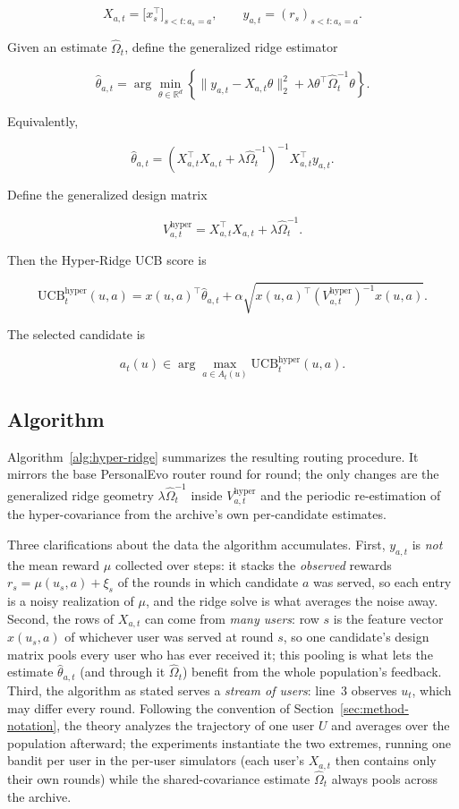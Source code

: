 \documentclass{article} %
\begin{document}
\[
X_{a,t} = \bigl[ x_s^\top \bigr]_{s < t : a_s = a}, \qquad
y_{a,t} = (r_s)_{s < t : a_s = a}.
\]

Given an estimate $\widehat{\Omega}_t$, define the generalized ridge estimator

\[
\widehat{\theta}_{a,t}
= \arg\min_{\theta \in \mathbb{R}^d}
\left\{ \| y_{a,t} - X_{a,t}\theta \|_2^2
      + \lambda \theta^\top \widehat{\Omega}_t^{-1} \theta \right\}.
\]

Equivalently,

\[
\widehat{\theta}_{a,t}
= \left( X_{a,t}^\top X_{a,t} + \lambda \widehat{\Omega}_t^{-1} \right)^{-1}
  X_{a,t}^\top y_{a,t}.
\]

Define the generalized design matrix

\[
V_{a,t}^{\mathrm{hyper}} = X_{a,t}^\top X_{a,t} + \lambda \widehat{\Omega}_t^{-1}.
\]

Then the Hyper-Ridge UCB score is

\[
\mathrm{UCB}_t^{\mathrm{hyper}}(u, a)
= x(u, a)^\top \widehat{\theta}_{a,t}
+ \alpha \sqrt{ x(u, a)^\top \left( V_{a,t}^{\mathrm{hyper}} \right)^{-1} x(u, a) }.
\]

The selected candidate is

\[
a_t(u) \in \arg\max_{a \in A_t(u)} \mathrm{UCB}_t^{\mathrm{hyper}}(u, a).
\]


\subsection{Algorithm}

\label{sec:method-alg}

Algorithm~\ref{alg:hyper-ridge} summarizes the resulting routing procedure.
It mirrors the base PersonalEvo router round for round; the only changes are
the generalized ridge geometry $\lambda \widehat{\Omega}_t^{-1}$ inside
$V_{a,t}^{\mathrm{hyper}}$ and the periodic re-estimation of the
hyper-covariance from the archive's own per-candidate estimates.

Three clarifications about the data the algorithm accumulates. First, $y_{a,t}$ is \emph{not} the mean reward $\mu$ collected over steps: it stacks the \emph{observed} rewards $r_s = \mu(u_s, a) + \xi_s$ of the rounds in which candidate $a$ was served, so each entry is a noisy realization of $\mu$, and the ridge solve is what averages the noise away. Second, the rows of $X_{a,t}$ can come from \emph{many users}: row $s$ is the feature vector $x(u_s, a)$ of whichever user was served at round $s$, so one candidate's design matrix pools every user who has ever received it; this pooling is what lets the estimate $\widehat\theta_{a,t}$ (and through it $\widehat\Omega_t$) benefit from the whole population's feedback. Third, the algorithm as stated serves a \emph{stream of users}: line~3 observes $u_t$, which may differ every round. Following the convention of Section~\ref{sec:method-notation}, the theory analyzes the trajectory of one user $U$ and averages over the population afterward; the experiments instantiate the two extremes, running one bandit per user in the per-user simulators (each user's $X_{a,t}$ then contains only their own rounds) while the shared-covariance estimate $\widehat\Omega_t$ always pools across the archive.
\end{document}
